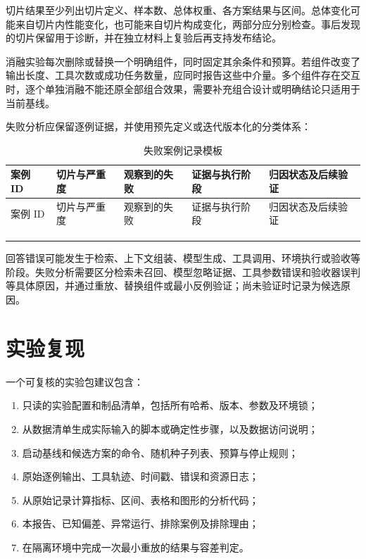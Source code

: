 \documentclass[../workbook.tex]{subfiles}
\begin{document}
切片结果至少列出切片定义、样本数、总体权重、各方案结果与区间。总体变化可能来自切片内性能变化，也可能来自切片构成变化，两部分应分别检查。事后发现的切片保留用于诊断，并在独立材料上复验后再支持发布结论。

消融实验每次删除或替换一个明确组件，同时固定其余条件和预算。若组件改变了输出长度、工具次数或成功任务数量，应同时报告这些中介量。多个组件存在交互时，逐个单独消融不能还原全部组合效果，需要补充组合设计或明确结论只适用于当前基线。

失败分析应保留逐例证据，并使用预先定义或迭代版本化的分类体系：
\begin{longtable}{@{}p{.15\linewidth}p{.15\linewidth}p{.18\linewidth}p{.17\linewidth}p{.22\linewidth}@{}}
\caption{失败案例记录模板}\label{tab:appendix-failure-log}\\
\toprule
案例 ID & 切片与严重度 & 观察到的失败 & 证据与执行阶段 & 归因状态及后续验证\\\midrule
\endfirsthead
\toprule
案例 ID & 切片与严重度 & 观察到的失败 & 证据与执行阶段 & 归因状态及后续验证\\\midrule
\endhead
 &  &  &  &  \\
 &  &  &  &  \\
 &  &  &  &  \\
\bottomrule
\end{longtable}

回答错误可能发生于检索、上下文组装、模型生成、工具调用、环境执行或验收等阶段。失败分析需要区分检索未召回、模型忽略证据、工具参数错误和验收器误判等具体原因，并通过重放、替换组件或最小反例验证；尚未验证时记录为候选原因。

\section{实验复现}

一个可复核的实验包建议包含：
\begin{enumerate}
 \item 只读的实验配置和制品清单，包括所有哈希、版本、参数及环境锁；
 \item 从数据清单生成实际输入的脚本或确定性步骤，以及数据访问说明；
 \item 启动基线和候选方案的命令、随机种子列表、预算与停止规则；
 \item 原始逐例输出、工具轨迹、时间戳、错误和资源日志；
 \item 从原始记录计算指标、区间、表格和图形的分析代码；
 \item 本报告、已知偏差、异常运行、排除案例及排除理由；
 \item 在隔离环境中完成一次最小重放的结果与容差判定。
\end{enumerate}
\end{document}
